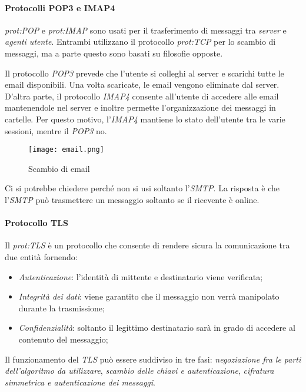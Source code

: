 \paragraph{Protocolli POP3 e IMAP4}
\emph{\gls{prot:POP}} e \emph{\gls{prot:IMAP}} sono usati per il trasferimento
di messaggi tra \emph{server} e \emph{agenti utente}. Entrambi utilizzano
il protocollo \emph{\gls{prot:TCP}} per lo scambio di messaggi, ma a parte questo
sono basati su filosofie opposte.

Il protocollo \emph{POP3} prevede che l'utente si colleghi al server e scarichi
tutte le email disponibili. Una volta scaricate, le email vengono eliminate dal
server. D'altra parte, il protocollo \emph{IMAP4} consente all'utente di accedere
alle email mantenendole nel server e inoltre permette l'organizzazione dei
messaggi in cartelle. Per questo motivo, l'\emph{IMAP4} mantiene lo stato
dell'utente tra le varie sessioni, mentre il \emph{POP3} no.

\begin{figure}[h!]
    \centering
    \texttt{[image: email.png]}
    \caption{Scambio di email}
\end{figure}

\begin{note}
    Ci si potrebbe chiedere perché non si usi soltanto l'\emph{SMTP}.
    La risposta è che l'\emph{SMTP} può trasmettere un messaggio soltanto se
    il ricevente è online.
\end{note}

\paragraph{Protocollo TLS}
Il \emph{\gls{prot:TLS}} è un protocollo che consente di rendere sicura la
comunicazione tra due entità fornendo:
\begin{itemize}
    \item \emph{Autenticazione}: l'identità di mittente e destinatario viene
    verificata;
    \item \emph{Integrità dei dati}: viene garantito che il messaggio non verrà
    manipolato durante la trasmissione;
    \item \emph{Confidenzialità}: soltanto il legittimo destinatario sarà in
    grado di accedere al contenuto del messaggio;
\end{itemize}
Il funzionamento del \emph{TLS} può essere suddiviso in tre fasi:
\emph{negoziazione fra le parti dell'algoritmo da utilizzare}, \emph{scambio delle
chiavi e autenticazione}, \emph{cifratura simmetrica e autenticazione dei messaggi}.

